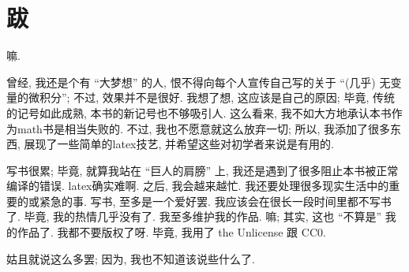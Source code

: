 \chapter{跋}

嘛.

曾经, 我还是个有 ``大梦想'' 的人,
恨不得向每个人宣传自己写的关于 ``(几乎) 无变量的微积分'';
不过, 效果并不是很好.
我想了想, 这应该是自己的原因;
毕竟, 传统的记号如此成熟, 本书的新记号也不够吸引人.
这么看来, 我不如大方地承认本书作为\gls{math}书是相当失败的.
不过, 我也不愿意就这么放弃一切;
所以, 我添加了很多东西, 展现了一些简单的\gls{latex}技艺,
并希望这些对初学者来说是有用的.

写书很累;
毕竟, 就算我站在 ``巨人的肩膀'' 上,
我还是遇到了很多阻止本书被正常编译的错误.
\gls{latex}确实难啊.
之后, 我会越来越忙.
我还要处理很多现实生活中的重要的或紧急的事.
写书, 至多是一个爱好罢.
我应该会在很长一段时间里都不写书了.
毕竟, 我的热情几乎没有了.
我至多维护我的作品.
嘛; 其实, 这也 ``不算是'' 我的作品了.
我都不要版权了呀.
毕竟, 我用了 the Unlicense 跟 CC0.

姑且就说这么多罢;
因为, 我也不知道该说些什么了.

\begin{flushright}
    \theauthor\\
    \thedate
\end{flushright}
